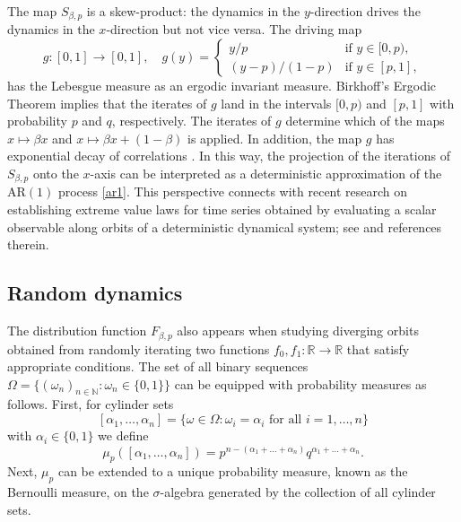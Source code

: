 \documentclass[12pt]{amsart}
\theoremstyle{definition}
\theoremstyle{remark}
\newcommand{\AR}{\operatorname{AR(1)}}
\numberwithin{equation}{section}
\begin{document}
The map $S_{\beta,p}$ is a skew-product: the dynamics in the $y$-direction drives the dynamics in the $x$-direction but not vice versa. The driving map
\[
g : [0,1] \to [0,1], \quad
g(y) =
\begin{cases}
	y/p				& \text{if } y \in [0,p), \\
	(y-p) / (1-p)	& \text{if } y \in [p,1],
\end{cases}
\]
has the Lebesgue measure as an ergodic invariant measure. Birkhoff's Ergodic Theorem implies that the iterates of $g$ land in the intervals $[0,p)$ and $[p,1]$ with probability $p$ and $q$, respectively. The iterates of $g$ determine which of the maps $x \mapsto \beta x$ and $x \mapsto \beta x + (1-\beta)$ is applied. In addition, the map $g$ has exponential decay of correlations \cite{BG}. In this way, the projection of the iterations of $S_{\beta,p}$ onto the $x$-axis can be interpreted as a deterministic approximation of the $\AR$ process \eqref{ar1}. This perspective connects with recent research on establishing extreme value laws for time series obtained by evaluating a scalar observable along orbits of a deterministic dynamical system; see \cite{LFFFHKNTV} and references therein.

\subsection{Random dynamics}

The distribution function $F_{\beta,p}$ also appears when studying diverging orbits obtained from randomly iterating two functions $f_0, f_1 : \mathbb{R} \to \mathbb{R}$ that satisfy appropriate conditions.
The set of all binary sequences $\Omega = \{(\omega_n)_{n \in \mathbb{N}} : \omega_n \in \{0,1\}\}$ can be equipped with probability measures as follows. First, for cylinder sets
\[
[\alpha_1,\dots,\alpha_n] = \{ \omega \in \Omega : \omega_i = \alpha_i \text{ for all } i=1,\dots,n \}
\]
with $\alpha_{i}\in\{0,1\}$ we define
\[
\mu_p([\alpha_1,\dots,\alpha_n]) = p^{n-(\alpha_1 + \dots + \alpha_n)} q^{\alpha_1 + \dots + \alpha_n}.
\]
Next, $\mu_p$ can be extended to a unique probability measure, known as the Bernoulli measure, on the $\sigma$-algebra generated by the collection of all cylinder sets.
\end{document}
